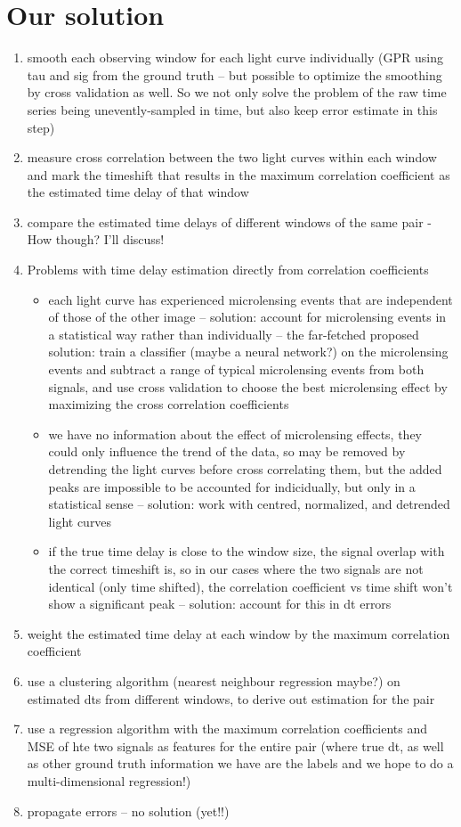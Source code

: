 \documentclass[a4paper, 11pt]{article}
\begin{document}
\section{Our solution}
  \begin{enumerate}
    \item smooth each observing window for each light curve individually (GPR using tau and sig from the ground truth -- but possible to optimize the smoothing by cross validation as well. So we not only solve the problem of the raw time series being unevently-sampled in time, but also keep error estimate in this step)
    \item measure cross correlation between the two light curves within each window and mark the timeshift that results in the maximum correlation coefficient as the estimated time delay of that window
    \item compare the estimated time delays of different windows of the same pair - How though? I'll discuss!
    \item Problems with time delay estimation directly from correlation coefficients
    \begin{itemize}
      \item each light curve has experienced microlensing events that are independent of those of the other image -- solution: account for microlensing events in a statistical way rather than individually -- the far-fetched proposed solution: train a classifier (maybe a neural network?) on the microlensing events and subtract a range of typical microlensing events from both signals, and use cross validation to choose the best microlensing effect by maximizing the cross correlation coefficients
      \item we have no information about the effect of microlensing effects, they could only influence the trend of the data, so may be removed by detrending the light curves before cross correlating them, but the added peaks are impossible to be accounted for indicidually, but only in a statistical sense -- solution:  work with centred, normalized, and detrended light curves
      \item if the true time delay is close to the window size, the signal overlap with the correct timeshift is, so in our cases where the two signals are not identical (only time shifted), the correlation coefficient vs time shift won't show a significant peak -- solution: account for this in dt errors
    \end{itemize}
    \item weight the estimated time delay at each window by the maximum correlation coefficient
    \item use a clustering algorithm (nearest neighbour regression maybe?) on estimated dts from different windows, to derive out estimation for the pair
    \item use a regression algorithm with the maximum correlation coefficients and MSE of hte two signals as features for the entire pair (where true dt, as well as other ground truth information we have are the labels and we hope to do a multi-dimensional regression!)
    \item propagate errors -- no solution (yet!!)
\end{enumerate}
\end{document}
